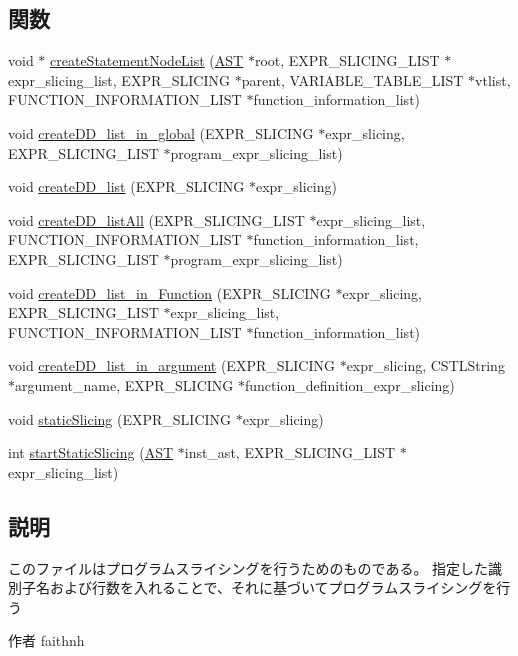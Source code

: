 \subsection*{関数}
\begin{DoxyCompactItemize}
\item 
void $\ast$ \hyperlink{ProgramSlicing_8h_a6a2ca14664f7ed318ed7f4a56ea79560}{createStatementNodeList} (\hyperlink{structabstract__syntax__tree}{AST} $\ast$root, EXPR\_\-SLICING\_\-LIST $\ast$expr\_\-slicing\_\-list, EXPR\_\-SLICING $\ast$parent, VARIABLE\_\-TABLE\_\-LIST $\ast$vtlist, FUNCTION\_\-INFORMATION\_\-LIST $\ast$function\_\-information\_\-list)
\item 
void \hyperlink{ProgramSlicing_8h_a7482809fe7168aab7be5176c11ccdaf8}{createDD\_\-list\_\-in\_\-global} (EXPR\_\-SLICING $\ast$expr\_\-slicing, EXPR\_\-SLICING\_\-LIST $\ast$program\_\-expr\_\-slicing\_\-list)
\item 
void \hyperlink{ProgramSlicing_8h_ad1682bc84f12e54629e4d7ceb4b34e30}{createDD\_\-list} (EXPR\_\-SLICING $\ast$expr\_\-slicing)
\item 
void \hyperlink{ProgramSlicing_8h_a8e5922cd376066300931a42aa9a263fa}{createDD\_\-listAll} (EXPR\_\-SLICING\_\-LIST $\ast$expr\_\-slicing\_\-list, FUNCTION\_\-INFORMATION\_\-LIST $\ast$function\_\-information\_\-list, EXPR\_\-SLICING\_\-LIST $\ast$program\_\-expr\_\-slicing\_\-list)
\item 
void \hyperlink{ProgramSlicing_8h_aefec4daeb571c2b448091c4f8bc81201}{createDD\_\-list\_\-in\_\-Function} (EXPR\_\-SLICING $\ast$expr\_\-slicing, EXPR\_\-SLICING\_\-LIST $\ast$expr\_\-slicing\_\-list, FUNCTION\_\-INFORMATION\_\-LIST $\ast$function\_\-information\_\-list)
\item 
void \hyperlink{ProgramSlicing_8h_a2ff3f358e5ececbd7410b57db736f8bf}{createDD\_\-list\_\-in\_\-argument} (EXPR\_\-SLICING $\ast$expr\_\-slicing, CSTLString $\ast$argument\_\-name, EXPR\_\-SLICING $\ast$function\_\-definition\_\-expr\_\-slicing)
\item 
void \hyperlink{ProgramSlicing_8h_a138a79f2268c9b23ea7c2777bf9dd9a6}{staticSlicing} (EXPR\_\-SLICING $\ast$expr\_\-slicing)
\item 
int \hyperlink{ProgramSlicing_8h_adb143d3b1bb729d23cf620666c81b063}{startStaticSlicing} (\hyperlink{structabstract__syntax__tree}{AST} $\ast$inst\_\-ast, EXPR\_\-SLICING\_\-LIST $\ast$expr\_\-slicing\_\-list)
\end{DoxyCompactItemize}


\subsection{説明}
このファイルはプログラムスライシングを行うためのものである。 指定した識別子名および行数を入れることで、それに基づいてプログラムスライシングを行う \begin{DoxyAuthor}{作者}
faithnh 
\end{DoxyAuthor}


